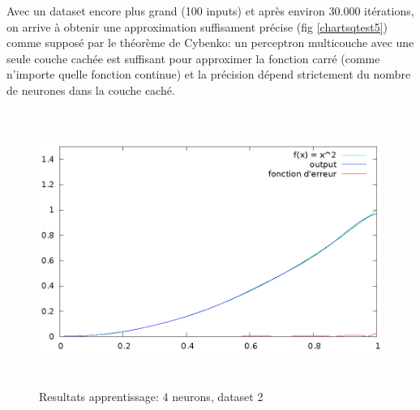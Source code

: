 \documentclass[twoside,openright,a4paper,11pt,french]{article}
\begin{document}
Avec un dataset encore plus grand (100 inputs) et après environ
30.000 itérations, on arrive à obtenir une approximation suffisament
précise (fig \ref{chartsqtest5}) comme supposé par le théorème de Cybenko:
un perceptron multicouche avec une seule couche cachée est suffisant pour
approximer la fonction carré (comme n'importe quelle fonction continue) 
et la précision dépend strictement du nombre de neurones dans la couche caché.

\begin{figure}[h]
\centering
\includegraphics[width=12cm,height=9cm]{./pics/chartsqtest5.eps}
\caption{Resultats apprentissage: 4 neurons, dataset 2}
\label{fig:chartsqtest5}
\end{figure}


\clearpage
{}


\end{document}
